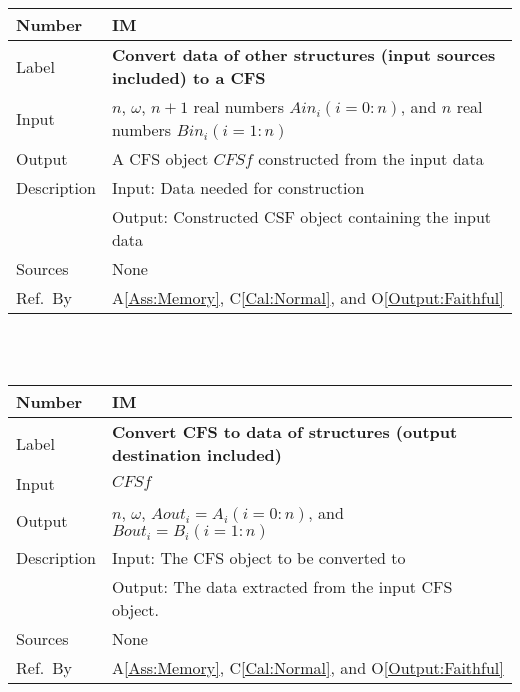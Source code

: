 \documentclass[12pt]{article}
\newcommand{\colAwidth}{0.13\textwidth}
\newcommand{\colBwidth}{0.82\textwidth}
\newcounter{instnum} %
\newcommand{\aref}[1]{A\ref{#1}}
\newcommand{\calref}[1]{C\ref{#1}}
\newcommand{\oref}[1]{O\ref{#1}}
\begin{document}
\noindent
\begin{minipage}{\textwidth}
	\renewcommand*{\arraystretch}{1.5}
	\begin{tabular}{| p{\colAwidth} | p{\colBwidth}|}
		\hline
		\rowcolor[gray]{0.9}
		Number& IM{instnum}\theinstnum 
		\label{IM:ConvertTo}\\
		\hline
		Label& \bf Convert data of other structures 
		(input sources included) to a CFS \\
		\hline
		Input& $n$, $\omega$, $n+1$ real numbers $\mathit{Ain}_{i} 
		(i=0:n)$, and $n$ real numbers $\mathit{Bin}_{i} (i=1:n)$\\
		\hline
		Output& A CFS object $\mathit{CFSf}$ constructed from 
		the input data\\
		\hline
		Description&Input: Data needed for construction\\
		&Output: Constructed CSF object containing the input data\\
		\hline
		Sources&None		\\
		\hline
		Ref.\ By &  \aref{Ass:Memory}, \calref{Cal:Normal}, 
		and \oref{Output:Faithful}\\
		\hline
	\end{tabular}
\end{minipage}\\
~\newline

\noindent
\begin{minipage}{\textwidth}
	\renewcommand*{\arraystretch}{1.5}
	\begin{tabular}{| p{\colAwidth} | p{\colBwidth}|}
		\hline
		\rowcolor[gray]{0.9}
		Number& IM{instnum}\theinstnum 
		\label{IM:ConvertFrom}\\
		\hline
		Label& \bf Convert CFS to data of structures 
		(output destination included) \\
		\hline
		Input& $\mathit{CFSf}$\\
		\hline
		Output& $n$, $\omega$, $\mathit{Aout}_{i}=A_i (i=0:n)$, 
		and $\mathit{Bout}_{i}=B_i (i=1:n)$\\
		\hline
		Description&Input: The CFS object to be converted to\\
		&Output: The data extracted from the input CFS object.\\
		\hline
		Sources&None\\
		\hline
		Ref.\ By &   \aref{Ass:Memory}, \calref{Cal:Normal}, 
		and \oref{Output:Faithful}\\
		\hline
	\end{tabular}
\end{minipage}\\
~\newline
\end{document}
